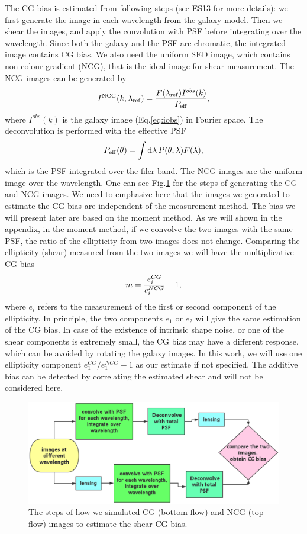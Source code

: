 \documentclass[useAMS,usenatbib]{mn2e}
\renewcommand{\d}{\mathrm{d}}
\newcommand{\be}{\begin{equation}}
\newcommand{\ee}{\end{equation}}
\begin{document}
The CG bias is estimated from following steps (see ES13 for more
details): we first generate the image in each wavelength from the
galaxy model. Then we shear the images, and apply the convolution with
PSF before integrating over the wavelength. Since both the galaxy and
the PSF are chromatic, the integrated image contains CG bias. We also
need the uniform SED image, which contains non-colour gradient (NCG),
that is the ideal image for shear measurement. The NCG images can be
generated by
%
\be
I^{\rm NCG}(k, \lambda_{\rm ref}) = \dfrac{F(\lambda_{\rm ref}) I^{obs}(k)}
{P_{\rm eff}},
\ee
%
where $I^{obs}(k)$ is the galaxy image (Eq.\ref{eq:iobs}) in Fourier space.
The deconvolution is performed with the effective PSF
%
\be
P_{\rm eff}(\theta) = \int \d \lambda\, P(\theta,\lambda) F(\lambda),
\ee
%
which is the PSF integrated over the filer band.
The NCG images are the uniform image over the wavelength. One
can see Fig.\ref{fig:flowchart} for the steps of generating the CG and
NCG images. We need to emphasize here that the images we generated
to estimate the CG bias are independent of the measurement method.
The bias we will present later are based on the moment method. As we
will shown in the appendix, in the moment method, if we convolve the
two images with the same PSF, the ratio of the ellipticity from two
images does not change.
%
Comparing the ellipticity (shear) measured from the two images we will
have the multiplicative CG bias \citep{2006MNRAS.368.1323H}
%
\be
m= {e_i^{CG} \over e_i^{NCG} }-1,
\ee
%
where $e_i$ refers to the measurement of the first or second component
of the ellipticity. In principle, the two components $e_1$ or $e_2$
will give the same estimation of the CG bias. In case of the existence
of intrinsic shape noise, or one of the shear components is extremely
small, the CG bias may have a different response, which can be avoided by
rotating the galaxy images. In this work, we will use one
ellipticity component $e_1^{CG}/e_1^{NCG}-1$ as our estimate if not
specified. The additive bias can be detected by correlating the
estimated shear and will not be considered here.
%
\begin{figure}
\includegraphics[width=12.5cm]{colourg.eps}
\caption{The steps of how we simulated CG (bottom flow) and NCG (top
  flow) images to estimate the shear CG bias.}
\label{fig:flowchart}
\end{figure}
%
\end{document}
